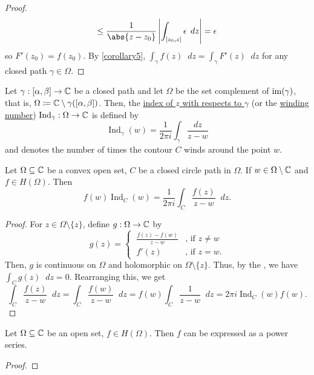 \documentclass[11pt]{article}
\DeclareMathOperator{\Ind}{Ind}
\newcommand*\dif{\mathop{}\!d}
\begin{document}
\begin{theorem}
\begin{proof}
\begin{equation*}
\leq \frac{1}{\abs{z-z_0}} \left|\int_{[z_0, z]} \epsilon \; \dif{z}\right|
= \epsilon
\end{equation*}
so $F'(z_0) = f(z_0)$. By \cref{corollary5}, $ \int_{\gamma} f(z) \dif z =
\int_{\gamma} F'(z) \dif z$ for any closed path $\gamma \in \Omega$.
\end{proof}
\begin{definition}
	Let $\gamma : [\alpha,\beta]\to\mathbb{C}$ be a closed path and let $\Omega$ be the
	set complement of $\operatorname{im}(\gamma)$, that is, $\Omega \coloneq
	\mathbb{C}\setminus\gamma([\alpha,\beta])$. Then, the \underline{index of $z$ with
	respects to $\gamma$} (or the \underline{winding number})
	$\Ind_\gamma:\Omega\to\C$ is defined by
	\begin{equation*}
		\Ind_\gamma(w) = \frac{1}{2\pi i} \int_{\gamma} \frac{dz}{z-w}
	\end{equation*}
	and denotes the number of times the contour $C$ winds around the point $w$.
\end{definition}
\begin{theorem} \label{theorem15}
	Let $\Omega\subseteq\mathbb{C}$ be a convex open set, $C$ be a closed circle path
	in $\Omega$. If $w \in \Omega\setminus\mathbb{C}$ and $f \in H(\Omega)$. Then
	\begin{equation*}
		f(w)\Ind_C(w) = \frac{1}{2\pi i} \int_C \frac{f(z)}{z-w} \dif z.
	\end{equation*}
\end{theorem}
\begin{proof}
	For $z \in \Omega\setminus\{z\}$, define $g:\Omega \to \mathbb{C}$ by
	\begin{equation*}
		g(z) =
		\begin{cases}
			\>\frac{f(z) - f(w)}{z-w} &\text{, if } z\neq w\\
			\>f'(z) &\text{, if } z=w.
		\end{cases}
	\end{equation*}
	Then, $g$ is continuous on $\Omega$ and holomorphic on $\Omega
	\setminus\{z\}$. Thus, by the , we have $\int_C g(z)\dif
	z = 0$. Rearranging this, we get
	\begin{equation*}
		\int_C \frac{f(z)}{z-w} \dif z = \int_C \frac{f(w)}{z-w} \dif z
		= f(w) \int_C \frac{1}{z-w}\dif z  = 2\pi i \Ind_C(w)f(w).
	\end{equation*}
\end{proof}
\end{theorem}
\begin{theorem} \label{theorem16}
	Let $\Omega\subseteq\mathbb{C}$ be an open set, $f \in H(\Omega)$. Then $f$ can be
	expressed as a power series.
\end{theorem}
\begin{proof}
	
\end{proof}
\end{document}
